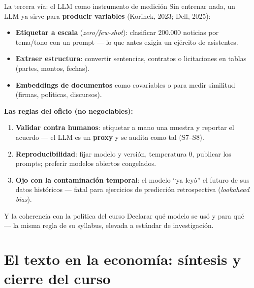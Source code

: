 \documentclass{beamer}
\newcommand{\1}{\mathbb{I}}
\begin{document}
\begin{frame}{La tercera vía: el LLM como instrumento de medición}
\small
Sin entrenar nada, un LLM ya sirve para \textbf{producir variables} (Korinek, 2023; Dell, 2025):
\begin{itemize}\itemsep4pt
  \item \textbf{Etiquetar a escala} (\emph{zero/few-shot}): clasificar 200.000 noticias por tema/tono con un prompt --- lo que antes exigía un ejército de asistentes.
  \item \textbf{Extraer estructura}: convertir sentencias, contratos o licitaciones en tablas (partes, montos, fechas).
  \item \textbf{Embeddings de documentos} como covariables o para medir similitud (firmas, políticas, discursos).
\end{itemize}
\pause

\vspace{0.15cm}
\textbf{Las reglas del oficio (no negociables):}
\begin{enumerate}\itemsep4pt
  \item \textbf{Validar contra humanos}: etiquetar a mano una muestra y reportar el acuerdo --- el LLM es un \textbf{proxy} y se audita como tal (S7--S8).
  \item \textbf{Reproducibilidad}: fijar modelo y versión, temperatura 0, publicar los prompts; preferir modelos abiertos congelados.
  \item \textbf{Ojo con la contaminación temporal}: el modelo ``ya leyó'' el futuro de sus datos históricos --- fatal para ejercicios de predicción retrospectiva (\emph{lookahead bias}).
\end{enumerate}
\pause

\begin{block}{Y la coherencia con la política del curso}
Declarar qué modelo se usó y para qué --- la misma regla de su syllabus, elevada a estándar de investigación.
\end{block}
\end{frame}


\section{El texto en la economía: síntesis y cierre del curso}
\begin{frame}[noframenumbering]
\tableofcontents[currentsection]
\end{frame}
\end{document}
